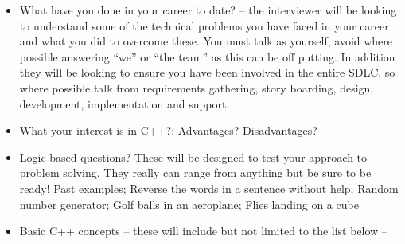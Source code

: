 \documentclass[a4paper, 10pt]{article}
\begin{document}
\begin{itemize}
    \item What have you done in your career to date? – the interviewer will be looking to understand some of the technical problems you have faced in your career and what you did to overcome these. You must talk as yourself, avoid where possible answering “we” or “the team” as this can be off putting. In addition they will be looking to ensure you have been involved in the entire SDLC, so where possible talk from requirements gathering, story boarding, design, development, implementation and support.
    \item What your interest is in C++?; Advantages? Disadvantages?
    \item Logic based questions? These will be designed to test your approach to problem solving. They really can range from anything but be sure to be ready! Past examples; Reverse the words in a sentence without help; Random number generator; Golf balls in an aeroplane; Flies landing on a cube
    \item Basic C++ concepts – these will include but not limited to the list below –
\end{itemize}
\end{document}
